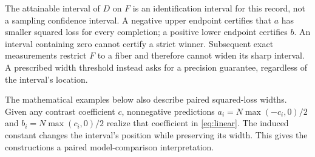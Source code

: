 The attainable interval of $D$ on $F$ is an identification interval for
this record, not a sampling confidence interval. A negative upper endpoint
certifies that $a$ has smaller squared loss for every completion; a positive
lower endpoint certifies $b$. An interval containing zero cannot certify
a strict winner. Subsequent exact measurements restrict $F$ to a fiber and
therefore cannot widen its sharp interval. A prescribed width threshold
instead asks for a precision guarantee, regardless of the interval's location.

The mathematical examples below also describe paired squared-loss widths.
Given any contrast coefficient $c$, nonnegative predictions
$a_i=N\max(-c_i,0)/2$ and $b_i=N\max(c_i,0)/2$ realize that coefficient
in \eqref{eq:linear}. The induced constant changes the interval's position
while preserving its width. This gives the constructions a paired
model-comparison interpretation.

